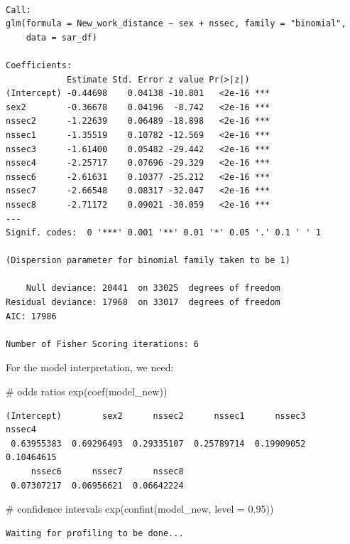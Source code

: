 \documentclass[
  letterpaper,
  DIV=11,
  numbers=noendperiod]{scrreprt}
\newenvironment{Shaded}{\begin{snugshade}}{\end{snugshade}}
\newcommand{\AttributeTok}[1]{\textcolor[rgb]{0.40,0.45,0.13}{#1}}
\newcommand{\CommentTok}[1]{\textcolor[rgb]{0.37,0.37,0.37}{#1}}
\newcommand{\FloatTok}[1]{\textcolor[rgb]{0.68,0.00,0.00}{#1}}
\newcommand{\FunctionTok}[1]{\textcolor[rgb]{0.28,0.35,0.67}{#1}}
\newcommand{\NormalTok}[1]{\textcolor[rgb]{0.00,0.23,0.31}{#1}}
\begin{document}
\begin{verbatim}

Call:
glm(formula = New_work_distance ~ sex + nssec, family = "binomial", 
    data = sar_df)

Coefficients:
            Estimate Std. Error z value Pr(>|z|)    
(Intercept) -0.44698    0.04138 -10.801   <2e-16 ***
sex2        -0.36678    0.04196  -8.742   <2e-16 ***
nssec2      -1.22639    0.06489 -18.898   <2e-16 ***
nssec1      -1.35519    0.10782 -12.569   <2e-16 ***
nssec3      -1.61400    0.05482 -29.442   <2e-16 ***
nssec4      -2.25717    0.07696 -29.329   <2e-16 ***
nssec6      -2.61631    0.10377 -25.212   <2e-16 ***
nssec7      -2.66548    0.08317 -32.047   <2e-16 ***
nssec8      -2.71172    0.09021 -30.059   <2e-16 ***
---
Signif. codes:  0 '***' 0.001 '**' 0.01 '*' 0.05 '.' 0.1 ' ' 1

(Dispersion parameter for binomial family taken to be 1)

    Null deviance: 20441  on 33025  degrees of freedom
Residual deviance: 17968  on 33017  degrees of freedom
AIC: 17986

Number of Fisher Scoring iterations: 6
\end{verbatim}

For the model interpretation, we need:

\begin{Shaded}
\begin{Highlighting}[]
\CommentTok{\# odds ratios}
\FunctionTok{exp}\NormalTok{(}\FunctionTok{coef}\NormalTok{(model\_new)) }
\end{Highlighting}
\end{Shaded}

\begin{verbatim}
(Intercept)        sex2      nssec2      nssec1      nssec3      nssec4 
 0.63955383  0.69296493  0.29335107  0.25789714  0.19909052  0.10464615 
     nssec6      nssec7      nssec8 
 0.07307217  0.06956621  0.06642224 
\end{verbatim}

\begin{Shaded}
\begin{Highlighting}[]
\CommentTok{\# confidence intervals}
\FunctionTok{exp}\NormalTok{(}\FunctionTok{confint}\NormalTok{(model\_new, }\AttributeTok{level =} \FloatTok{0.95}\NormalTok{)) }
\end{Highlighting}
\end{Shaded}

\begin{verbatim}
Waiting for profiling to be done...
\end{verbatim}
\end{document}
